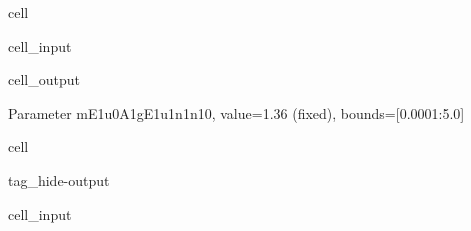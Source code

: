 \documentclass[letterpaper,table,10pt,english]{jupyterBook}
\begin{document}
\begin{sphinxuseclass}{cell}\begin{sphinxVerbatimInput}

\begin{sphinxuseclass}{cell_input}
\begin{sphinxVerbatim}[commandchars=\\\{\}]
\PYG{p}{[}\PYG{p}{]}  
\PYG{p}{[}\PYG{p}{]}  
\PYG{p}{[}\PYG{p}{]}
\end{sphinxVerbatim}

\end{sphinxuseclass}\end{sphinxVerbatimInput}
\begin{sphinxVerbatimOutput}

\begin{sphinxuseclass}{cell_output}
\begin{sphinxVerbatim}[commandchars=\\\{\}]
\PYGZlt{}Parameter \PYGZsq{}m\PYGZus{}E1u\PYGZus{}0\PYGZus{}A1g\PYGZus{}E1u\PYGZus{}1\PYGZus{}n1\PYGZus{}n1\PYGZus{}0\PYGZsq{}, value=1.36 (fixed), bounds=[0.0001:5.0]\PYGZgt{}
\end{sphinxVerbatim}

\end{sphinxuseclass}\end{sphinxVerbatimOutput}

\end{sphinxuseclass}
\begin{sphinxuseclass}{cell}
\begin{sphinxuseclass}{tag_hide-output}\begin{sphinxVerbatimInput}

\begin{sphinxuseclass}{cell_input}
\begin{sphinxVerbatim}[commandchars=\\\{\}]
\end{sphinxVerbatim}

\end{sphinxuseclass}\end{sphinxVerbatimInput}

\end{sphinxuseclass}
\end{sphinxuseclass}
\end{document}

